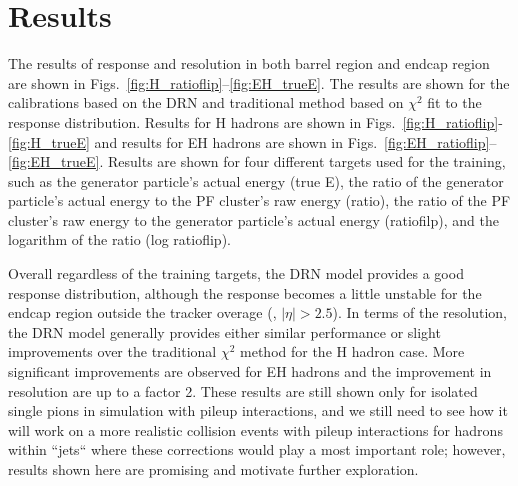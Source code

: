 \section{Results}
The results of response and resolution in both barrel region and endcap region are shown in Figs.~\ref{fig:H_ratioflip}--\ref{fig:EH_trueE}.
The results are shown for the calibrations based on the DRN and traditional method based on $\chi^2$ fit to the response distribution.
Results for H hadrons are shown in Figs.~\ref{fig:H_ratioflip}-\ref{fig:H_trueE} and results for EH hadrons are shown in Figs.~\ref{fig:EH_ratioflip}--\ref{fig:EH_trueE}.
Results are shown for four different targets used for the training, such as the generator particle's actual energy (true E), the ratio of the generator particle's actual energy to the PF cluster's raw energy (ratio), the ratio of the PF cluster's raw energy to the generator particle's actual energy (ratiofilp), and the logarithm of the ratio (log ratioflip). 

Overall regardless of the training targets, the DRN model provides a good response distribution, although the response becomes a little unstable for the endcap region outside the tracker overage (\ie, $|\eta|>2.5$).
In terms of the resolution, the DRN model generally provides either similar performance or slight improvements over the traditional $\chi^2$ method for the H hadron case.
More significant improvements are observed for EH hadrons and the improvement in resolution are up to a factor 2.
These results are still shown only for isolated single pions in simulation with pileup interactions, and we still need to see how it will work on a more realistic collision events with pileup interactions for hadrons within ``jets`` where these corrections would play a most important role; however, results shown here are promising and motivate further exploration.













